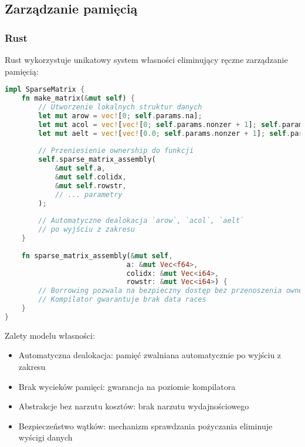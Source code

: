 \subsection{Zarządzanie pamięcią}
\subsubsection{Rust}
Rust wykorzystuje unikatowy system własności eliminujący ręczne zarządzanie pamięcią:
\begin{lstlisting}[language=Rust, caption={Zarządzanie pamięcią w Rust}, label={lst:cg_rust_memory}]
    impl SparseMatrix {
    fn make_matrix(&mut self) {
        // Utworzenie lokalnych struktur danych
        let mut arow = vec![0; self.params.na];
        let mut acol = vec![vec![0; self.params.nonzer + 1]; self.params.na];
        let mut aelt = vec![vec![0.0; self.params.nonzer + 1]; self.params.na];
        
        // Przeniesienie ownership do funkcji
        self.sparse_matrix_assembly(
            &mut self.a, 
            &mut self.colidx, 
            &mut self.rowstr,
            // ... parametry
        );
        
        // Automatyczne dealokacja `arow`, `acol`, `aelt` 
        // po wyjściu z zakresu
    }
    
    fn sparse_matrix_assembly(&mut self, 
                             a: &mut Vec<f64>, 
                             colidx: &mut Vec<i64>, 
                             rowstr: &mut Vec<i64>) {
        // Borrowing pozwala na bezpieczny dostęp bez przenoszenia ownership
        // Kompilator gwarantuje brak data races
    }
}
\end{lstlisting}
Zalety modelu własności:
\begin{itemize}
    \item Automatyczna dealokacja: pamięć zwalniana automatycznie po wyjściu z zakresu
    \item Brak wycieków pamięci: gwarancja na poziomie kompilatora
    \item Abstrakcje bez narzutu kosztów: brak narzutu wydajnościowego
    \item Bezpieczeństwo wątków: mechanizm sprawdzania pożyczania eliminuje wyścigi danych
\end{itemize}

